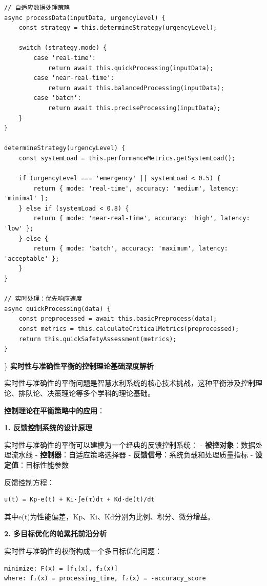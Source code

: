 \begin{verbatim}
// 自适应数据处理策略
async processData(inputData, urgencyLevel) {
    const strategy = this.determineStrategy(urgencyLevel);
    
    switch (strategy.mode) {
        case 'real-time':
            return await this.quickProcessing(inputData);
        case 'near-real-time':
            return await this.balancedProcessing(inputData);
        case 'batch':
            return await this.preciseProcessing(inputData);
    }
}

determineStrategy(urgencyLevel) {
    const systemLoad = this.performanceMetrics.getSystemLoad();
    
    if (urgencyLevel === 'emergency' || systemLoad < 0.5) {
        return { mode: 'real-time', accuracy: 'medium', latency: 'minimal' };
    } else if (systemLoad < 0.8) {
        return { mode: 'near-real-time', accuracy: 'high', latency: 'low' };
    } else {
        return { mode: 'batch', accuracy: 'maximum', latency: 'acceptable' };
    }
}

// 实时处理：优先响应速度
async quickProcessing(data) {
    const preprocessed = await this.basicPreprocess(data);
    const metrics = this.calculateCriticalMetrics(preprocessed);
    return this.quickSafetyAssessment(metrics);
}
\end{verbatim}

\} \textbf{实时性与准确性平衡的控制理论基础深度解析}

实时性与准确性的平衡问题是智慧水利系统的核心技术挑战，这种平衡涉及控制理论、排队论、决策理论等多个学科的理论基础。

\textbf{控制理论在平衡策略中的应用}：

\textbf{1. 反馈控制系统的设计原理}

实时性与准确性的平衡可以建模为一个经典的反馈控制系统： - \textbf{被控对象}：数据处理流水线 - \textbf{控制器}：自适应策略选择器 - \textbf{反馈信号}：系统负载和处理质量指标 - \textbf{设定值}：目标性能参数

反馈控制方程：

\begin{lstlisting}
u(t) = Kp·e(t) + Ki·∫e(τ)dτ + Kd·de(t)/dt
\end{lstlisting}

其中e(t)为性能偏差，Kp、Ki、Kd分别为比例、积分、微分增益。

\textbf{2. 多目标优化的帕累托前沿分析}

实时性与准确性的权衡构成一个多目标优化问题：

\begin{lstlisting}
minimize: F(x) = [f₁(x), f₂(x)]
where: f₁(x) = processing_time, f₂(x) = -accuracy_score
\end{lstlisting}

